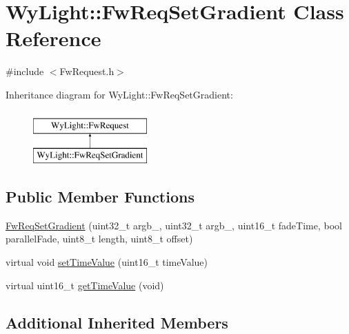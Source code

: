 \hypertarget{class_wy_light_1_1_fw_req_set_gradient}{\section{Wy\-Light\-:\-:Fw\-Req\-Set\-Gradient Class Reference}
\label{class_wy_light_1_1_fw_req_set_gradient}
}


{\ttfamily \#include $<$Fw\-Request.\-h$>$}

Inheritance diagram for Wy\-Light\-:\-:Fw\-Req\-Set\-Gradient\-:\begin{figure}[H]
\begin{center}
\leavevmode
\includegraphics[height=2.000000cm]{class_wy_light_1_1_fw_req_set_gradient}
\end{center}
\end{figure}
\subsection*{Public Member Functions}
\begin{DoxyCompactItemize}
\item 
\hyperlink{class_wy_light_1_1_fw_req_set_gradient_a09c0b6dbaf3e204516e3d1e54b0eb4e9}{Fw\-Req\-Set\-Gradient} (uint32\-\_\-t argb\-\_, uint32\-\_\-t argb\-\_, uint16\-\_\-t fade\-Time, bool parallel\-Fade, uint8\-\_\-t length, uint8\-\_\-t offset)
\item 
virtual void \hyperlink{class_wy_light_1_1_fw_req_set_gradient_a76dea1660c57ec227a972ef2bb7ac3b9}{set\-Time\-Value} (uint16\-\_\-t time\-Value)
\item 
virtual uint16\-\_\-t \hyperlink{class_wy_light_1_1_fw_req_set_gradient_ad4281e7cda6e269d7d5d20f3ff4eaf18}{get\-Time\-Value} (void)
\end{DoxyCompactItemize}
\subsection*{Additional Inherited Members}


